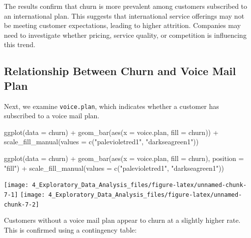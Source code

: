 \documentclass[
  11pt,
]{book}
\makeatletter
\newenvironment{Shaded}{}{}
\newcommand{\AttributeTok}[1]{#1}
\newcommand{\DecValTok}[1]{#1}
\newcommand{\FunctionTok}[1]{#1}
\newcommand{\NormalTok}[1]{#1}
\newcommand{\SpecialCharTok}[1]{\textcolor[rgb]{0.39,0.39,0.39}{#1}}
\newcommand{\StringTok}[1]{\textcolor[rgb]{0.39,0.39,0.39}{#1}}
\newenvironment{kframe}{%
\medskip{}
\setlength{\fboxsep}{.8em}
 \def\at@end@of@kframe{}%
 \ifinner\ifhmode%
  \def\at@end@of@kframe{\end{minipage}}%
  \begin{minipage}{\columnwidth}%
 \fi\fi%
 \def\FrameCommand##1{\hskip\@totalleftmargin \hskip-\fboxsep
 \colorbox{shadecolor}{##1}\hskip-\fboxsep
     \hskip-\linewidth \hskip-\@totalleftmargin \hskip\columnwidth}%
 \MakeFramed {\advance\hsize-\width
   \@totalleftmargin\z@ \linewidth\hsize
   \@setminipage}}%
 {\par\unskip\endMakeFramed%
 \at@end@of@kframe}
\renewenvironment{Shaded}{\begin{kframe}}{\end{kframe}}
\theoremstyle{definition}
\theoremstyle{definition}
\theoremstyle{definition}
\theoremstyle{definition}
\theoremstyle{remark}
\makeatother
\begin{document}
The results confirm that churn is more prevalent among customers subscribed to an international plan. This suggests that international service offerings may not be meeting customer expectations, leading to higher attrition. Companies may need to investigate whether pricing, service quality, or competition is influencing this trend.

\subsection*{Relationship Between Churn and Voice Mail Plan}\label{relationship-between-churn-and-voice-mail-plan}


Next, we examine \texttt{voice.plan}, which indicates whether a customer has subscribed to a voice mail plan.

\begin{Shaded}
\begin{Highlighting}[]
\FunctionTok{ggplot}\NormalTok{(}\AttributeTok{data =}\NormalTok{ churn) }\SpecialCharTok{+} 
  \FunctionTok{geom\_bar}\NormalTok{(}\FunctionTok{aes}\NormalTok{(}\AttributeTok{x =}\NormalTok{ voice.plan, }\AttributeTok{fill =}\NormalTok{ churn)) }\SpecialCharTok{+}
  \FunctionTok{scale\_fill\_manual}\NormalTok{(}\AttributeTok{values =} \FunctionTok{c}\NormalTok{(}\StringTok{"palevioletred1"}\NormalTok{, }\StringTok{"darkseagreen1"}\NormalTok{)) }

\FunctionTok{ggplot}\NormalTok{(}\AttributeTok{data =}\NormalTok{ churn) }\SpecialCharTok{+} 
  \FunctionTok{geom\_bar}\NormalTok{(}\FunctionTok{aes}\NormalTok{(}\AttributeTok{x =}\NormalTok{ voice.plan, }\AttributeTok{fill =}\NormalTok{ churn), }\AttributeTok{position =} \StringTok{"fill"}\NormalTok{) }\SpecialCharTok{+}
  \FunctionTok{scale\_fill\_manual}\NormalTok{(}\AttributeTok{values =} \FunctionTok{c}\NormalTok{(}\StringTok{"palevioletred1"}\NormalTok{, }\StringTok{"darkseagreen1"}\NormalTok{)) }
\end{Highlighting}
\end{Shaded}

\texttt{[image: 4\_Exploratory\_Data\_Analysis\_files/figure-latex/unnamed-chunk-7-1]} \texttt{[image: 4\_Exploratory\_Data\_Analysis\_files/figure-latex/unnamed-chunk-7-2]}

Customers without a voice mail plan appear to churn at a slightly higher rate. This is confirmed using a contingency table:

\begin{Shaded}
\end{Shaded}
\end{document}
